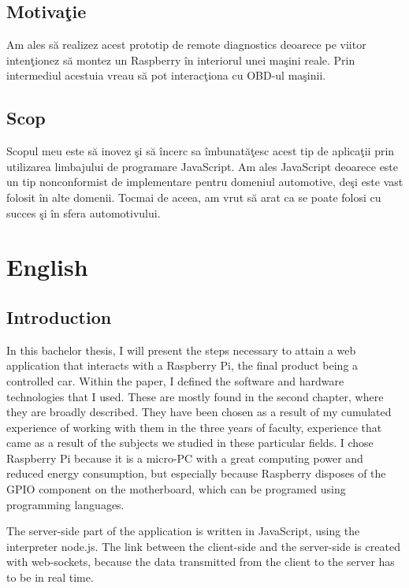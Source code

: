\subsection{Motiva\c tie}

Am ales s\u a realizez acest prototip de remote diagnostics deoarece pe viitor inten\c tionez s\u a montez un Raspberry \^ in interiorul unei ma\c sini reale. Prin intermediul acestuia vreau s\u a pot interac\c tiona cu OBD-ul ma\c sinii.


\subsection{Scop}

Scopul meu este s\u a inovez \c si s\u a \^ incerc sa \^ imbunat\u a\c tesc acest tip de aplica\c tii prin utilizarea limbajului de programare JavaScript. 
Am ales JavaScript deoarece este un tip nonconformist de implementare pentru domeniul automotive, de\c si este vast folosit \^ in alte domenii. Tocmai de aceea, am  vrut s\u a arat ca se poate folosi cu succes \c si \^ in sfera automotivului.
\section{English}

\subsection{Introduction}
In this bachelor thesis, I will present the steps necessary to attain a web application that interacts with a Raspberry Pi, the final product being a controlled car. Within the paper, I defined the software and hardware technologies that I used. These are mostly found in the second chapter, where they are broadly described. They have been chosen as a result of my cumulated experience of working with them in the three years of faculty, experience that came as a result of the subjects we studied in these particular fields. I chose Raspberry Pi because it is a micro-PC with a great computing power and reduced energy consumption, but especially because Raspberry disposes of the GPIO component on the motherboard, which can be programed using programming languages. 

The server-side part of the application is written in JavaScript, using the interpreter node.js. The link between the client-side and the server-side is created with web-sockets, because the data transmitted from the client to the server has to be in real time. 

